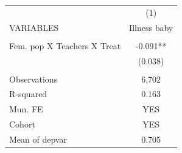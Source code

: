 \begin{tabular}{lc} \hline
 & (1) \\
VARIABLES & Illness baby \\ \hline
 &  \\
Fem. pop X Teachers X Treat & -0.091** \\
 & (0.038) \\
 &  \\
Observations & 6,702 \\
R-squared & 0.163 \\
Mun. FE & YES \\
Cohort & YES \\
 Mean of depvar & 0.705 \\ \hline
\end{tabular}
